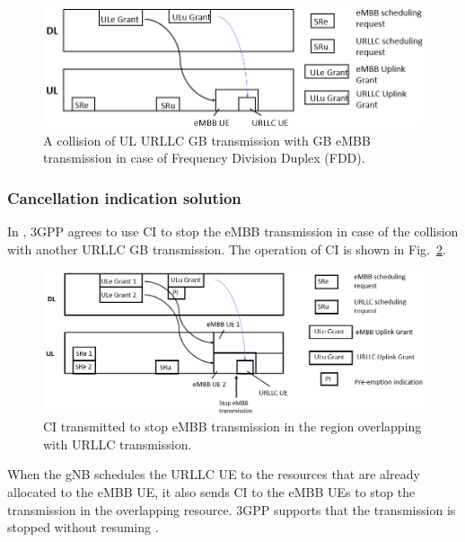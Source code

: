 \documentclass{ieeeaccess}
\begin{document}
\begin{figure}[htbp]
\centerline{\includegraphics[scale=0.33]{fig7.PNG}}
\caption{A collision of UL URLLC GB transmission with GB eMBB transmission in case of Frequency Division Duplex (FDD).}
\label{fig7}
\vspace{-4mm}
\end{figure}

\subsubsection{Cancellation indication solution}

In \cite{ref20}, 3GPP agrees to use CI to stop the eMBB transmission in case of the collision with another URLLC GB transmission. The operation of CI is shown in Fig.~\ref{fig8}.

\begin{figure}[htbp]
\centerline{\includegraphics[scale=0.33]{fig8.PNG}}
\caption{CI transmitted to stop eMBB transmission in the region overlapping with URLLC transmission.}
\label{fig8}
\vspace{-2mm}
\end{figure}

When the gNB schedules the URLLC UE to the resources that are already allocated to the eMBB UE, it also sends CI to the eMBB UEs to stop the transmission in the overlapping resource. 3GPP supports that the transmission is stopped without resuming \cite{ref20}. 
\end{document}

